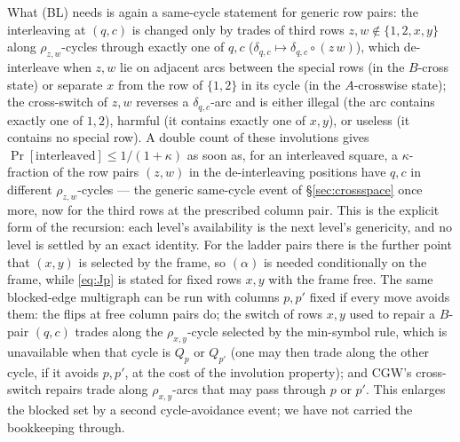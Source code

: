What (BL) needs is again a same-cycle statement for generic row pairs:
the interleaving at $(q,c)$ is changed only by trades of third rows
$z,w\notin\{1,2,x,y\}$ along $\rho_{z,w}$-cycles through exactly one
of $q,c$ ($\delta_{q,c}\mapsto\delta_{q,c}\circ(z\,w)$), which
de-interleave when $z,w$ lie on adjacent arcs between the special
rows (in the $B$-cross state) or separate $x$ from the row of
$\{1,2\}$ in its cycle (in the $A$-crosswise state); the
cross-switch of $z,w$ reverses a $\delta_{q,c}$-arc and is either
illegal (the arc contains exactly one of $1,2$), harmful (it contains
exactly one of $x,y$), or useless (it contains no special row).  A
double count of these involutions gives
$\Pr[\text{interleaved}]\le1/(1+\kappa)$ as soon as, for an
interleaved square, a $\kappa$-fraction of the row pairs $(z,w)$ in
the de-interleaving positions have $q,c$ in different
$\rho_{z,w}$-cycles --- the generic same-cycle event of
\S\ref{sec:crossspace} once more, now for the third rows at the
prescribed column pair.  This is the explicit form of the recursion:
each level's availability is the next level's genericity, and no
level is settled by an exact identity.  For the ladder pairs there is
the further point that $(x,y)$ is selected by the frame, so
$(\alpha)$ is needed conditionally on the frame, while \eqref{eq:Jp}
is stated for fixed rows $x,y$ with the frame free.  The same
blocked-edge multigraph can be run with columns $p,p'$ fixed if every
move avoids them: the flips at free column pairs do; the switch of
rows $x,y$ used to repair a $B$-pair $(q,c)$ trades along the
$\rho_{x,y}$-cycle selected by the min-symbol rule, which is
unavailable when that cycle is $Q_p$ or $Q_{p'}$ (one may then trade
along the other cycle, if it avoids $p,p'$, at the cost of the
involution property); and CGW's cross-switch repairs trade along
$\rho_{x,y}$-arcs that may pass through $p$ or $p'$.  This enlarges
the blocked set by a second cycle-avoidance event; we have not carried
the bookkeeping through.

